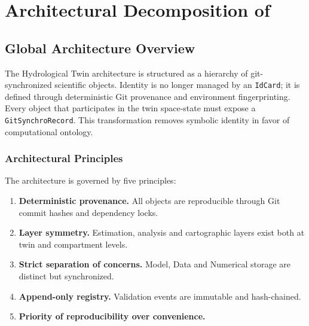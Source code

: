 \chapter{Architectural Decomposition of \hydrot}
\label{chap-arch-decomp}

\fancyhead[LE]{\thepage}
\fancyhead[RO]{\thepage}
\renewcommand{\headrulewidth}{1pt}

\setlength{\parindent}{0cm}
\setlength{\parskip}{9pt}

\htastarget



\section{Global Architecture Overview}
\label{ch:architecture}

The Hydrological Twin architecture is structured as a hierarchy of git-synchronized scientific objects. Identity is no longer managed by an \texttt{IdCard}; it is defined through deterministic Git provenance and environment fingerprinting. Every object that participates in the twin space-state must expose a \texttt{GitSynchroRecord}. This transformation removes symbolic identity in favor of computational ontology.

\subsection{Architectural Principles}

The architecture is governed by five principles:

\begin{enumerate}
\item \textbf{Deterministic provenance.} All objects are reproducible through Git commit hashes and dependency locks.
\item \textbf{Layer symmetry.} Estimation, analysis and cartographic layers exist both at twin and compartment levels.
\item \textbf{Strict separation of concerns.} Model, Data and Numerical storage are distinct but synchronized.
\item \textbf{Append-only registry.} Validation events are immutable and hash-chained.
\item \textbf{Priority of reproducibility over convenience.}
\end{enumerate}

